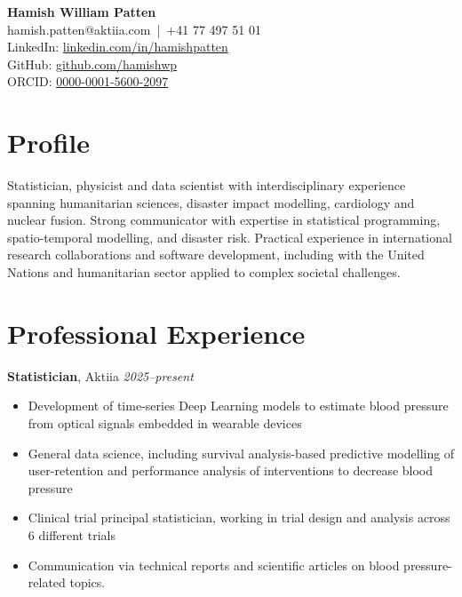 \documentclass[a4paper,10pt]{article}
\begin{document}
\begin{center}
    {\LARGE \textbf{Hamish William Patten}} \\
    \vspace{0.2cm}
    hamish.patten@aktiia.com \,|\, +41 77 497 51 01 \\
    LinkedIn: \href{https://linkedin.com/in/hamishpatten}{linkedin.com/in/hamishpatten} \\
    GitHub: \href{https://github.com/hamishwp}{github.com/hamishwp} \\
    ORCID: \href{https://orcid.org/0000-0001-5600-2097}{0000-0001-5600-2097}
\end{center}

\section*{Profile}

Statistician, physicist and data scientist with interdisciplinary experience spanning humanitarian sciences, disaster impact modelling, cardiology and nuclear fusion. Strong communicator with expertise in statistical programming, spatio-temporal modelling, and disaster risk. Practical experience in international research collaborations and software development, including with the United Nations and humanitarian sector applied to complex societal challenges.

\section*{Professional Experience}

\textbf{Statistician}, Aktiia \hfill \textit{2025–present} 
\begin{itemize}[noitemsep]
  \item Development of time-series Deep Learning models to estimate blood pressure from optical signals embedded in wearable devices
  \item General data science, including survival analysis-based predictive modelling of user-retention and performance analysis of interventions to decrease blood pressure 
  \item Clinical trial principal statistician, working in trial design and analysis across 6 different trials
  \item Communication via technical reports and scientific articles on blood pressure-related topics.
\end{itemize}
\end{document}
